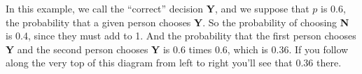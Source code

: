 \documentclass{exam}
\newcommand{\mycompress}[1]{\ifdefined\compressedformat\relax\else#1\fi}
\newcommand{\mynewpage}{\mycompress{\newpage}}
\begin{document}
\begin{center}
\end{center}
In this example, we call the ``correct'' decision \textbf{Y}, and we
suppose that $p$ is 0.6, the probability that a given
person chooses \textbf{Y}. So the probability of choosing \textbf{N} is 0.4,
since they must add to 1.
And the probability that the first
person chooses \textbf{Y} and the second person chooses \textbf{Y} is 0.6
times 0.6, which is 0.36.  If you follow along the very top of this diagram
from left to right you'll see that 0.36 there. 

\mynewpage
\end{document}
